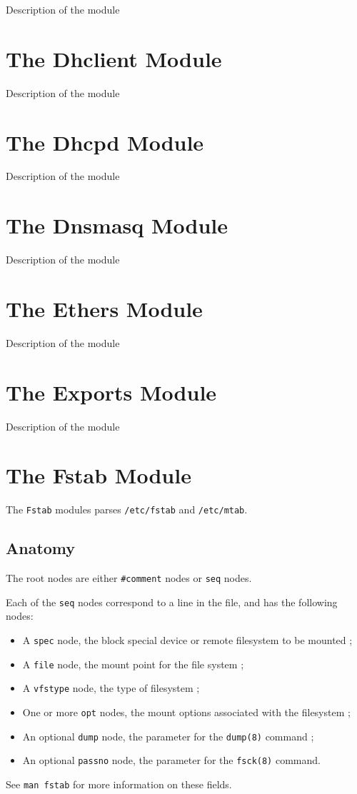 Description of the module

\section{The Dhclient Module}

Description of the module

\section{The Dhcpd Module}

Description of the module

\section{The Dnsmasq Module}

Description of the module

\section{The Ethers Module}

Description of the module

\section{The Exports Module}

Description of the module

\section{The Fstab Module}

The \verb!Fstab! modules parses \nolinkurl{/etc/fstab} and \nolinkurl{/etc/mtab}.

\subsection{Anatomy}

The root nodes are either \verb!#comment! nodes or \verb!seq! nodes.

Each of the \verb!seq! nodes correspond to a line in the file, and has the following nodes:

\begin{itemize}
\item
  A \verb!spec! node, the block special device or remote filesystem to be mounted ;
\item
  A \verb!file! node, the mount point for the file system ;
\item
  A \verb!vfstype! node, the type of filesystem ;
\item
  One or more \verb!opt! nodes, the mount options associated with the filesystem ;
\item
  An optional \verb!dump! node, the parameter for the \verb!dump(8)! command ;
\item
  An optional \verb!passno! node, the parameter for the \verb!fsck(8)! command.
\end{itemize}
See \verb!man fstab! for more information on these fields.

